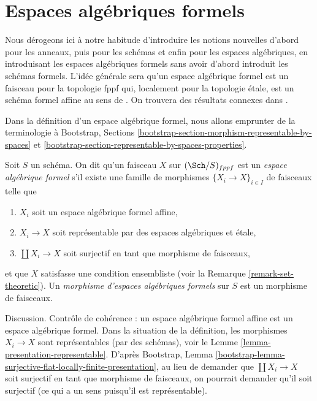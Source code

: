 \section{Espaces algébriques formels}
\label{section-formal-algebraic-spaces}

\noindent
Nous dérogeons ici à notre habitude d'introduire les notions nouvelles d'abord
pour les anneaux, puis pour les schémas et enfin pour les espaces algébriques, en
introduisant les espaces algébriques formels sans avoir d'abord introduit les
schémas formels. L'idée générale sera qu'un espace algébrique formel
est un faisceau pour la topologie fppf qui, localement pour la topologie étale, est un
schéma formel affine au sens de \cite{BVGD}.
On trouvera des résultats connexes dans \cite{Yasuda}.

\medskip\noindent
Dans la définition d'un espace algébrique formel, nous allons
emprunter de la terminologie à
Bootstrap, Sections
\ref{bootstrap-section-morphism-representable-by-spaces} et
\ref{bootstrap-section-representable-by-spaces-properties}.

\begin{definition}
\label{definition-formal-algebraic-space}
Soit $S$ un schéma. On dit qu'un faisceau $X$ sur $(\Sch/S)_{fppf}$ est un
{\it espace algébrique formel} s'il existe une famille de morphismes
$\{X_i \to X\}_{i \in I}$ de faisceaux telle que
\begin{enumerate}
\item $X_i$ soit un espace algébrique formel affine,
\item $X_i \to X$ soit représentable par des espaces algébriques et étale,
\item $\coprod X_i \to X$ soit surjectif en tant que morphisme de faisceaux,
\end{enumerate}
et que $X$ satisfasse une condition ensembliste
(voir la Remarque \ref{remark-set-theoretic}). Un
{\it morphisme d'espaces algébriques formels}
sur $S$ est un morphisme de faisceaux.
\end{definition}

\noindent
Discussion. Contrôle de cohérence : un espace algébrique formel affine est
un espace algébrique formel. Dans la situation de la définition,
les morphismes $X_i \to X$ sont représentables (par des schémas), voir le
Lemme \ref{lemma-presentation-representable}.
D'après Bootstrap, Lemma
\ref{bootstrap-lemma-surjective-flat-locally-finite-presentation},
au lieu de demander que $\coprod X_i \to X$ soit
surjectif en tant que morphisme de faisceaux, on pourrait demander qu'il soit
surjectif (ce qui a un sens puisqu'il est représentable).

